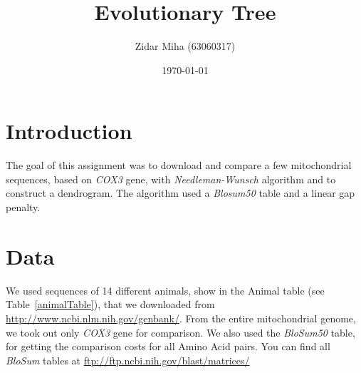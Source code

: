 \documentclass[a4paper,11pt]{article}
\title{Evolutionary Tree}
\author{Zidar Miha (63060317)}
\date{\today}
\begin{document}
\maketitle

\section{Introduction}

The goal of this assignment was to download and compare a few mitochondrial sequences, based on \textit{COX3} gene, with \textit{Needleman-Wunsch} algorithm and to construct a dendrogram. The algorithm used a \textit{Blosum50} table and a linear gap penalty.

\section{Data}

We used sequences of 14 different animals, show in the Animal table (see Table~\ref{animalTable}), that we downloaded from \url{http://www.ncbi.nlm.nih.gov/genbank/}. From the entire mitochondrial genome, we took out only \textit{COX3} gene for comparison. We also used the \textit{BloSum50} table, for getting the comparison costs for all Amino Acid pairs. You can find all \textit{BloSum} tables at \url{ftp://ftp.ncbi.nih.gov/blast/matrices/}
\end{document}

